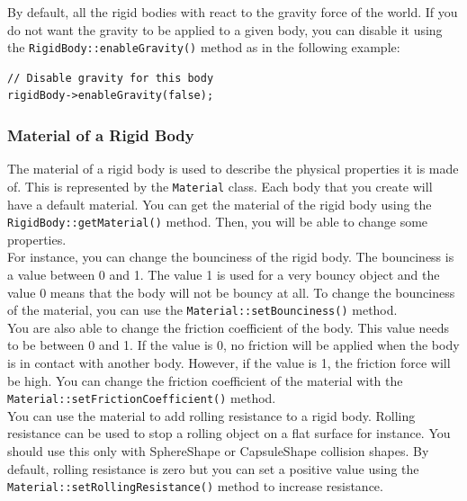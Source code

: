 \documentclass[a4paper,12pt]{article}
\begin{document}
    By default, all the rigid bodies with react to the gravity force of the world. If you do not want the gravity to be applied to a given body, you can disable
    it using the \texttt{RigidBody::enableGravity()} method as in the following example: \\

    \begin{lstlisting}
// Disable gravity for this body
rigidBody->enableGravity(false);
  \end{lstlisting}

    \subsubsection{Material of a Rigid Body}

    The material of a rigid body is used to describe the physical properties it is made of. This is represented by the \texttt{Material} class. Each body that
    you create will have a default material. You can get the material of the rigid body using the \texttt{RigidBody::\allowbreak getMaterial()} method. Then, you will be able to change some
    properties. \\

    For instance, you can change the bounciness of the rigid body. The bounciness is a value between 0 and 1. The value 1 is used for a very bouncy object and the value 0 means that
    the body will not be bouncy at all. To change the bounciness of the material, you can use the \texttt{Material::\allowbreak setBounciness()} method. \\

    You are also able to change the friction coefficient of the body. This value needs to be between 0 and 1. If the value is 0, no friction will be applied when the body is in contact with
    another body. However, if the value is 1, the friction force will be high. You can change the friction coefficient of the material with the
    \texttt{Material::\allowbreak setFrictionCoefficient()} method. \\

    You can use the material to add rolling resistance to a rigid body. Rolling resistance can be used to stop
    a rolling object on a flat surface for instance. You should use this only with SphereShape or
    CapsuleShape collision shapes. By default, rolling resistance is zero but you can
    set a positive value using the \texttt{Material::\allowbreak setRollingResistance()} method to increase resistance. \\
\end{document}

